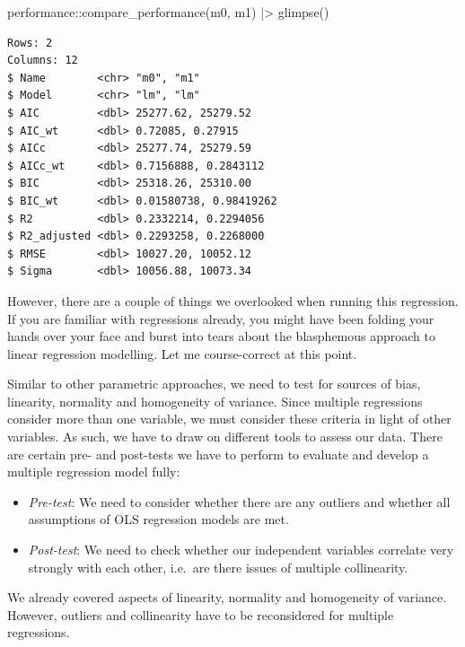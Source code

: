 \documentclass[
  letterpaper,
  DIV=11,
  numbers=noendperiod]{scrreprt}
\newenvironment{Shaded}{\begin{snugshade}}{\end{snugshade}}
\newcommand{\FunctionTok}[1]{\textcolor[rgb]{0.28,0.35,0.67}{#1}}
\newcommand{\NormalTok}[1]{\textcolor[rgb]{0.00,0.23,0.31}{#1}}
\newcommand{\SpecialCharTok}[1]{\textcolor[rgb]{0.37,0.37,0.37}{#1}}
\begin{document}
\begin{Shaded}
\begin{Highlighting}[]
\NormalTok{performance}\SpecialCharTok{::}\FunctionTok{compare\_performance}\NormalTok{(m0, m1) }\SpecialCharTok{|\textgreater{}}
  \FunctionTok{glimpse}\NormalTok{()}
\end{Highlighting}
\end{Shaded}

\begin{verbatim}
Rows: 2
Columns: 12
$ Name        <chr> "m0", "m1"
$ Model       <chr> "lm", "lm"
$ AIC         <dbl> 25277.62, 25279.52
$ AIC_wt      <dbl> 0.72085, 0.27915
$ AICc        <dbl> 25277.74, 25279.59
$ AICc_wt     <dbl> 0.7156888, 0.2843112
$ BIC         <dbl> 25318.26, 25310.00
$ BIC_wt      <dbl> 0.01580738, 0.98419262
$ R2          <dbl> 0.2332214, 0.2294056
$ R2_adjusted <dbl> 0.2293258, 0.2268000
$ RMSE        <dbl> 10027.20, 10052.12
$ Sigma       <dbl> 10056.88, 10073.34
\end{verbatim}

However, there are a couple of things we overlooked when running this
regression. If you are familiar with regressions already, you might have
been folding your hands over your face and burst into tears about the
blasphemous approach to linear regression modelling. Let me
course-correct at this point.

Similar to other parametric approaches, we need to test for sources of
bias, linearity, normality and homogeneity of variance. Since multiple
regressions consider more than one variable, we must consider these
criteria in light of other variables. As such, we have to draw on
different tools to assess our data. There are certain pre- and
post-tests we have to perform to evaluate and develop a multiple
regression model fully:

\begin{itemize}
\item
  \emph{Pre-test}: We need to consider whether there are any outliers
  and whether all assumptions of OLS regression models are met.
\item
  \emph{Post-test}: We need to check whether our independent variables
  correlate very strongly with each other, i.e.~are there issues of
  multiple collinearity.
\end{itemize}

We already covered aspects of linearity, normality and homogeneity of
variance. However, outliers and collinearity have to be reconsidered for
multiple regressions.
\end{document}
